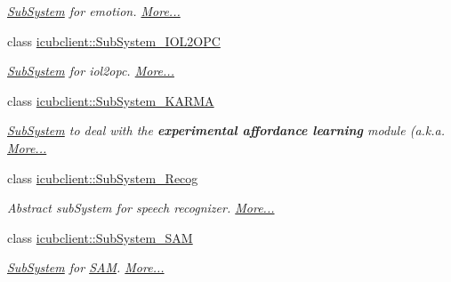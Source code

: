 \begin{DoxyCompactItemize}
\begin{DoxyCompactList}\small\item\em \hyperlink{group__icubclient__subsystems_classicubclient_1_1SubSystem}{Sub\+System} for emotion.  \hyperlink{group__icubclient__subsystems_classicubclient_1_1SubSystem__emotion}{More...}\end{DoxyCompactList}\item 
class \hyperlink{group__icubclient__subsystems_classicubclient_1_1SubSystem__IOL2OPC}{icubclient\+::\+Sub\+System\+\_\+\+I\+O\+L2\+O\+PC}
\begin{DoxyCompactList}\small\item\em \hyperlink{group__icubclient__subsystems_classicubclient_1_1SubSystem}{Sub\+System} for iol2opc.  \hyperlink{group__icubclient__subsystems_classicubclient_1_1SubSystem__IOL2OPC}{More...}\end{DoxyCompactList}\item 
class \hyperlink{group__icubclient__subsystems_classicubclient_1_1SubSystem__KARMA}{icubclient\+::\+Sub\+System\+\_\+\+K\+A\+R\+MA}
\begin{DoxyCompactList}\small\item\em \hyperlink{group__icubclient__subsystems_classicubclient_1_1SubSystem}{Sub\+System} to deal with the {\bfseries experimental affordance learning} module (a.\+k.\+a.  \hyperlink{group__icubclient__subsystems_classicubclient_1_1SubSystem__KARMA}{More...}\end{DoxyCompactList}\item 
class \hyperlink{group__icubclient__subsystems_classicubclient_1_1SubSystem__Recog}{icubclient\+::\+Sub\+System\+\_\+\+Recog}
\begin{DoxyCompactList}\small\item\em Abstract sub\+System for speech recognizer.  \hyperlink{group__icubclient__subsystems_classicubclient_1_1SubSystem__Recog}{More...}\end{DoxyCompactList}\item 
class \hyperlink{group__icubclient__subsystems_classicubclient_1_1SubSystem__SAM}{icubclient\+::\+Sub\+System\+\_\+\+S\+AM}
\begin{DoxyCompactList}\small\item\em \hyperlink{group__icubclient__subsystems_classicubclient_1_1SubSystem}{Sub\+System} for \hyperlink{namespaceSAM}{S\+AM}.  \hyperlink{group__icubclient__subsystems_classicubclient_1_1SubSystem__SAM}{More...}\end{DoxyCompactList}\item 

\end{DoxyCompactItemize}
